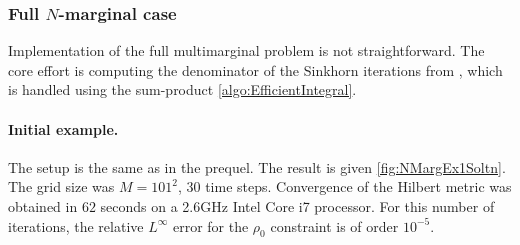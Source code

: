 \documentclass[../report.tex]{subfiles}
\begin{document}
\subsubsection{Full $N$-marginal case}

Implementation of the full multimarginal problem is not straightforward. The core effort is computing the denominator of the Sinkhorn iterations from , which is handled using the sum-product \cref{algo:EfficientIntegral}.


\paragraph{Initial example.} The setup is the same as in the prequel. The result is given \cref{fig:NMargEx1Soltn}. The grid size was $M = 101^2$, $30$ time steps. Convergence of the Hilbert metric was obtained in $62$ seconds on a 2.6GHz Intel Core i7 processor. For this number of iterations, the relative $L^\infty$ error for the $\rho_0$ constraint is of order $10^{-5}$.
\end{document}
